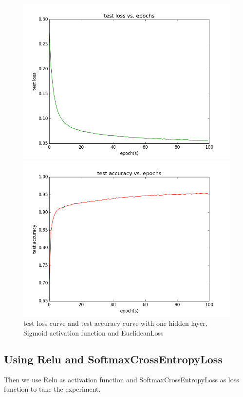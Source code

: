 \documentclass{elegantbook}
\begin{document}
\begin{figure}[!ht]
	\centering
	\begin{minipage}[t]{0.45\textwidth}
		\centering
		\includegraphics[width=\textwidth]{testloss1se}
	\end{minipage}
	\begin{minipage}[t]{0.45\textwidth}
		\centering
		\includegraphics[width=\textwidth]{testacc1se}
	\end{minipage}
	\caption{\label{testcurve2}test loss curve and test accuracy curve with one hidden layer, Sigmoid activation function and EuclideanLoss}
\end{figure}

\subsection{Using Relu and SoftmaxCrossEntropyLoss}
Then we use Relu as activation function and SoftmaxCrossEntropyLoss as loss function to take the experiment.
\end{document}

